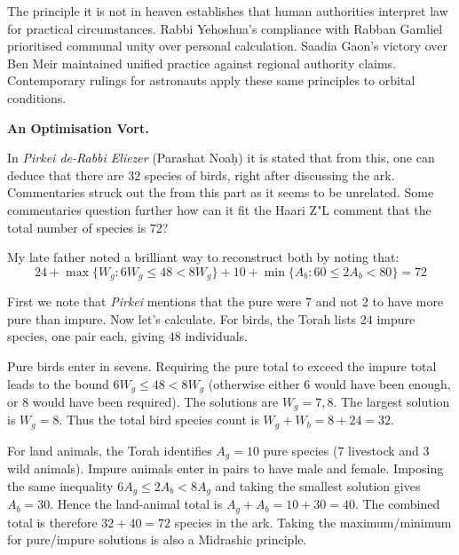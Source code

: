 The principle \QENOpen{}it is not in heaven\QENClose{} establishes that human authorities interpret law for practical circumstances. Rabbi Yehoshua's compliance with Rabban Gamliel prioritised communal unity over personal calculation. Saadia Gaon's victory over Ben Meir maintained unified practice against regional authority claims. Contemporary rulings for astronauts apply these same principles to orbital conditions.
\medskip
\begin{tcolorbox}[
    enhanced,
    colback=lightblue,
    colframe=gray!40,
    boxrule=0.5pt,
    arc=2mm,
    left=10pt,
    right=10pt,
    top=8pt,
    bottom=8pt
]
\small
\textbf{An Optimisation Vort.}

\medskip
In \textit{Pirkei de-Rabbi Eliezer} (Parashat Noaḥ) it is stated that \QENOpen{}from this, one can deduce that there are $32$ species of birds,\QENClose{} right after discussing the ark. Commentaries struck out the \QENOpen{}from this\QENClose{} part as it seems to be unrelated. Some commentaries question further how can it fit the Haari Z"L comment that the total number of species is $72$?

\medskip
My late father noted a brilliant way to reconstruct both by noting that:
\[ 24 + \max\{W_g : 6W_g \le 48 < 8W_g\} + 10 + \min\{A_b : 60 \le 2A_b < 80\} = 72 \]

\medskip
First we note that \textit{Pirkei} mentions that the pure were $7$ and not $2$ to have more pure than impure. Now let's calculate. For birds, the Torah lists $24$ impure species, one pair each, giving $48$ individuals.

\medskip
Pure birds enter in sevens. Requiring the pure total to exceed the impure total leads to the bound $6W_g \le 48 < 8W_g$ (otherwise either $6$ would have been enough, or $8$ would have been required). The solutions are $W_g = 7, 8$. The largest solution is $W_g = 8$. Thus the total bird species count is $W_g + W_b = 8 + 24 = 32$.

\medskip
For land animals, the Torah identifies $A_g = 10$ pure species ($7$ livestock and $3$ wild animals). Impure animals enter in pairs to have male and female. Imposing the same inequality $6A_g \le 2A_b < 8A_g$ and taking the smallest solution gives $A_b = 30$. Hence the land-animal total is $A_g + A_b = 10 + 30 = 40$. The combined total is therefore $32 + 40 = 72$ species in the ark. Taking the maximum/minimum for pure/impure solutions is also a Midrashic principle. \blacksquare 


\end{tcolorbox}

